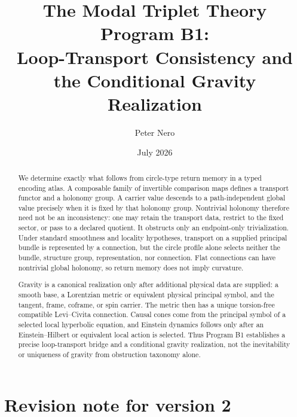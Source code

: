\documentclass[11pt]{article}
\title{The Modal Triplet Theory Program B1:\\
Loop-Transport Consistency and the Conditional Gravity Realization}
\author{Peter Nero}
\date{July 2026}
\begin{document}
\maketitle

\begin{abstract}
We determine exactly what follows from circle-type return memory in a typed
encoding atlas.  A composable family of invertible comparison maps defines a
transport functor and a holonomy group.  A carrier value descends to a
path-independent global value precisely when it is fixed by that holonomy
group.  Nontrivial holonomy therefore need not be an inconsistency: one may
retain the transport data, restrict to the fixed sector, or pass to a declared
quotient.  It obstructs only an endpoint-only trivialization.  Under standard
smoothness and locality hypotheses, transport on a supplied principal bundle
is represented by a connection, but the circle profile alone selects neither
the bundle, structure group, representation, nor connection.  Flat
connections can have nontrivial global holonomy, so return memory does not
imply curvature.

Gravity is a canonical realization only after additional physical data are
supplied: a smooth base, a Lorentzian metric or equivalent physical principal
symbol, and the tangent, frame, coframe, or spin carrier.  The metric then has
a unique torsion-free compatible Levi--Civita connection.  Causal cones come
from the principal symbol of a selected local hyperbolic equation, and
Einstein dynamics follows only after an Einstein--Hilbert or equivalent local
action is selected.  Thus Program B1 establishes a precise loop-transport
bridge and a conditional gravity realization, not the inevitability or
uniqueness of gravity from obstruction taxonomy alone.
\end{abstract}

\section*{Revision note for version 2}
\end{document}
